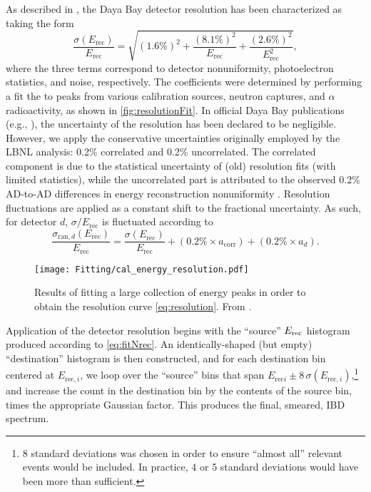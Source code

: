 \documentclass[../thesis.tex]{subfiles}
\begin{document}
As described in \cite{An_2017}, the Daya Bay detector resolution has been characterized as taking the form
\begin{equation}
  \label{eq:resolution}
  \frac{\sigma(E_{\mathrm{rec}})}{E_{\mathrm{rec}}} = \sqrt{(1.6\%)^2 + \frac{(8.1\%)^2}{E_{\mathrm{rec}}}
    + \frac{(2.6\%)^2}{E_{\mathrm{rec}}^2}},
\end{equation}
where the three terms correspond to detector nonuniformity, photoelectron statistics, and noise, respectively. The coefficients were determined by performing a fit the to peaks from various calibration sources, neutron captures, and $\alpha$ radioactivity, as shown in \autoref{fig:resolutionFit}. In official Daya Bay publications (e.g., \cite{An_2017}), the uncertainty of the resolution has been declared to be negligible. However, we apply the conservative uncertainties originally employed by the LBNL analysis: 0.2\% correlated and 0.2\% uncorrelated. The correlated component is due to the statistical uncertainty of (old) resolution fits (with limited statistics), while the uncorrelated part is attributed to the observed 0.2\% AD-to-AD differences in energy reconstruction nonuniformity \cite{berkeley_toymc}. Resolution fluctuations are applied as a constant shift to the fractional uncertainty. As such, for detector $d$, $\sigma/E_{\mathrm{rec}}$ is fluctuated according to
\begin{equation}
  \frac{\sigma_{\mathrm{ran},d}(E_{\mathrm{rec}})}{E_{\mathrm{rec}}} = \frac{\sigma(E_{\mathrm{rec}})}{E_{\mathrm{rec}}} + (0.2\% \times a_{\mathrm{corr}})  + (0.2\% \times a_d).
\end{equation}

\begin{figure}[ht]
  \texttt{[image: Fitting/cal\_energy\_resolution.pdf]}
  \caption{Results of fitting a large collection of energy peaks in order to obtain the resolution curve \autoref{eq:resolution}. From \cite{An_2017}.}
  \label{fig:resolutionFit}
\end{figure}

Application of the detector resolution begins with the ``source'' $E_\mathrm{rec}$ histogram produced according to \autoref{eq:fitNrec}. An identically-shaped (but empty) ``destination'' histogram is then constructed, and for each destination bin centered at $E_{\mathrm{rec},i}$, we loop over the ``source'' bins that span $E_{\mathrm{rec}i} \pm 8\,\sigma(E_{\mathrm{rec},i})$,\footnote{8 standard deviations was chosen in order to ensure ``almost all'' relevant events would be included. In practice, 4 or 5 standard deviations would have been more than sufficient.} and increase the count in the destination bin by the contents of the source bin, times the appropriate Gaussian factor. This produces the final, smeared, IBD spectrum.
\end{document}
